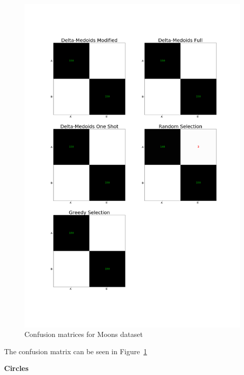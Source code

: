 \documentclass[thesis=B,english]{FITthesis}[2012/10/20]
\begin{document}
\begin{figure}[t]
   \includegraphics[width=\linewidth]{img/exp1_moons.png}
  \caption{Confusion matrices for Moons dataset}
  \label{img:exp1_moons}
\end{figure}
\noindent The confusion matrix can be seen in Figure~\ref{img:exp1_moons}

\textbf{Circles}
\end{document}
